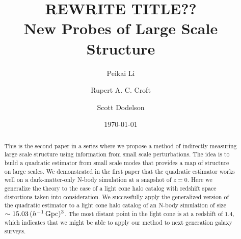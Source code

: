 \documentclass[prd,amsmath,amssymb,floatfix,superscriptaddress,nofootinbib,twocolumn]{revtex4-1}
\begin{document}
\title{REWRITE TITLE??\\New Probes of Large Scale Structure}
\author{\large Peikai Li}
\author{\large Rupert A. C. Croft}
\author{\large Scott Dodelson}

\date{\today}


\begin{abstract}
\noindent This is the second paper in a series where we propose a method of indirectly measuring large scale structure using information from small scale perturbations. The idea is to build a quadratic estimator from small scale modes that provides a map of structure on large scales.
We demonstrated in the first paper that the quadratic estimator works well on a dark-matter-only N-body simulation at a snapshot of $z=0$. Here we generalize the theory to the case of a light cone halo catalog with redshift space distortions taken into consideration. We successfully apply the generalized version of the quadratic estimator to a light cone halo catalog of an N-body simulation of size $\sim15.03\,(h^{-1}\,\rm Gpc)^3$. The most distant point in the light cone is at a redshift of $1.4$, which indicates that we might be able to apply our method to next generation galaxy surveys.
\end{abstract}
\maketitle
\end{document}
